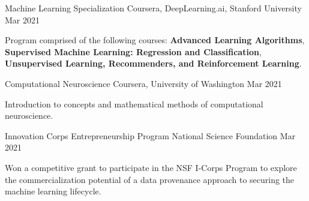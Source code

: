 

\begin{cventries}

  
    \cventry
    {Machine Learning Specialization} %
    {Coursera, DeepLearning.ai, Stanford University} %
    {} %
    {Mar 2021} %
    {
      \begin{cvitems} %
        \item {Program comprised of the following courses: \textbf{Advanced Learning Algorithms}, \textbf{Supervised Machine Learning: Regression and Classification}, \textbf{Unsupervised Learning, Recommenders, and Reinforcement Learning}.}
      \end{cvitems}
    }
  
  \cventry
    {Computational Neuroscience} %
    {Coursera, University of Washington} %
    {} %
    {Mar 2021} %
    {
      \begin{cvitems} %
        \item {Introduction to concepts and mathematical methods of computational neuroscience.}
      \end{cvitems}
    }
    
  \cventry
    {Innovation Corps Entrepreneurship Program} %
    {National Science Foundation} %
    {} %
    {Mar 2021} %
    {
      \begin{cvitems} %
        \item {Won a competitive grant to participate in the NSF I-Corps Program to explore the commercialization potential of a data provenance approach to securing the machine learning lifecycle.}
      \end{cvitems}
    }
    

\end{cventries}
